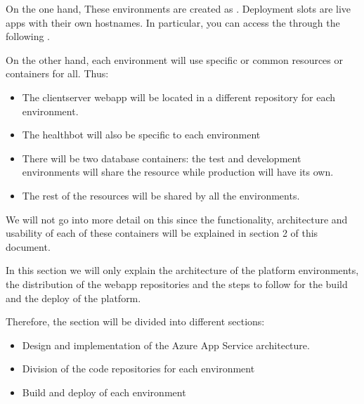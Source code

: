 \documentclass[letterpaper,10pt,english]{sphinxmanual}
\begin{document}
On the one hand, These environments are created as . Deployment slots are live apps with their own hostnames.
In particular, you can access the  through the following .

On the other hand, each environment will use specific or common resources or containers for all. Thus:
\begin{itemize}
\item {} 
The client\sphinxhyphen{}server webapp will be located in a different repository for each environment.

\item {} 
The healthbot will also be specific to each environment

\item {} 
There will be two database containers: the test and development environments will share the resource while production will have its own.

\item {} 
The rest of the resources will be shared by all the environments.

\end{itemize}

We will not go into more detail on this since the functionality, architecture and usability of each of these containers will be explained in section 2 of this document.

In this section we will only explain the architecture of the platform environments, the distribution of the webapp repositories and the steps to follow for the build and the deploy of the platform.

Therefore, the section will be divided into different sections:
\begin{itemize}
\item {} 
Design and implementation of the Azure App Service architecture.

\item {} 
Division of the code repositories for each environment

\item {} 
Build and deploy of each environment

\end{itemize}
\end{document}
